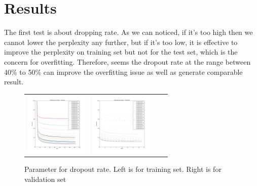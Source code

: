 \documentclass{article}
\begin{document}
\section{Results}
The first test is about dropping rate. As we can noticed, if it's too high then we cannot lower the perplexity any further, but if it's too low, it is effective to improve the perplexity on training set but not for the test set, which is the concern for overfitting. Therefore, seems the dropout rate at the range between 40\% to 50\% can improve the overfitting issue as well as generate comparable result.
\begin{figure}[h]
\centering
\begin{subfigure}
  \begin{tabular}{cccc}
  {\includegraphics[width = 30mm]{../lstm_me/fig/Drop_train.png}}&
  {\includegraphics[width = 30mm]{../lstm_me/fig/Drop_val.png}}
  \end{tabular}
\end{subfigure}
\caption{Parameter for dropout rate. Left is for training set. Right is for validation set}
\end{figure}
\end{document}
